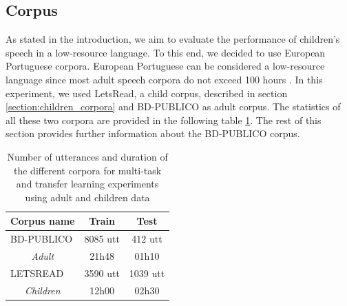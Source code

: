 \subsection{Corpus}
\label{sec:corpus}
As stated in the introduction, we aim to evaluate the performance of children's speech in a low-resource language. To this end, we decided to use European Portuguese corpora. European Portuguese can be considered a low-resource language since most adult speech corpora do not exceed 100 hours \cite{tribus}.
In this experiment, we used LetsRead, a child corpus, described in section \ref{section:children_corpora} and BD-PUBLICO as adult corpus. %
The statistics of all these two corpora are provided in the following table \ref{tab:statistics_exp1}. The rest of this section provides further information about the BD-PUBLICO corpus.%

\begin{table}[h]
\begin{center}
\begin{tabular}{lcc}
\hline
Corpus name      & Train & Test  \\ \hline
\multicolumn{1}{l}{BD-PUBLICO}             & 8085 utt  & 412 utt  \\ 
\multicolumn{1}{c}{\textit{Adult}}              & 21h48 & 01h10 \\\hline
\multicolumn{1}{l}{LETSREAD}     & 3590 utt & 1039 utt \\ 
\multicolumn{1}{c}{\textit{Children}}     & 12h00 & 02h30 \\  \hline
\end{tabular}
\caption{Number of utterances and duration of the different corpora for multi-task and transfer learning experiments using adult and children data}
\label{tab:statistics_exp1}
\end{center}
\end{table}

